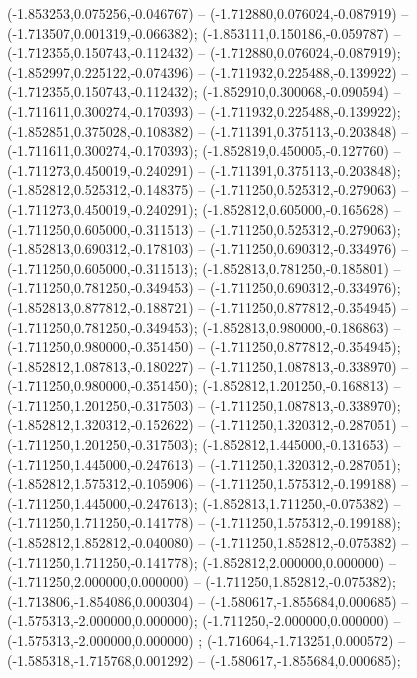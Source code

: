  (-1.853253,0.075256,-0.046767) -- (-1.712880,0.076024,-0.087919) -- (-1.713507,0.001319,-0.066382);
 (-1.853111,0.150186,-0.059787) -- (-1.712355,0.150743,-0.112432) -- (-1.712880,0.076024,-0.087919);
 (-1.852997,0.225122,-0.074396) -- (-1.711932,0.225488,-0.139922) -- (-1.712355,0.150743,-0.112432);
 (-1.852910,0.300068,-0.090594) -- (-1.711611,0.300274,-0.170393) -- (-1.711932,0.225488,-0.139922);
 (-1.852851,0.375028,-0.108382) -- (-1.711391,0.375113,-0.203848) -- (-1.711611,0.300274,-0.170393);
 (-1.852819,0.450005,-0.127760) -- (-1.711273,0.450019,-0.240291) -- (-1.711391,0.375113,-0.203848);
 (-1.852812,0.525312,-0.148375) -- (-1.711250,0.525312,-0.279063) -- (-1.711273,0.450019,-0.240291);
 (-1.852812,0.605000,-0.165628) -- (-1.711250,0.605000,-0.311513) -- (-1.711250,0.525312,-0.279063);
 (-1.852813,0.690312,-0.178103) -- (-1.711250,0.690312,-0.334976) -- (-1.711250,0.605000,-0.311513);
 (-1.852813,0.781250,-0.185801) -- (-1.711250,0.781250,-0.349453) -- (-1.711250,0.690312,-0.334976);
 (-1.852813,0.877812,-0.188721) -- (-1.711250,0.877812,-0.354945) -- (-1.711250,0.781250,-0.349453);
 (-1.852813,0.980000,-0.186863) -- (-1.711250,0.980000,-0.351450) -- (-1.711250,0.877812,-0.354945);
 (-1.852812,1.087813,-0.180227) -- (-1.711250,1.087813,-0.338970) -- (-1.711250,0.980000,-0.351450);
 (-1.852812,1.201250,-0.168813) -- (-1.711250,1.201250,-0.317503) -- (-1.711250,1.087813,-0.338970);
 (-1.852812,1.320312,-0.152622) -- (-1.711250,1.320312,-0.287051) -- (-1.711250,1.201250,-0.317503);
 (-1.852812,1.445000,-0.131653) -- (-1.711250,1.445000,-0.247613) -- (-1.711250,1.320312,-0.287051);
 (-1.852812,1.575312,-0.105906) -- (-1.711250,1.575312,-0.199188) -- (-1.711250,1.445000,-0.247613);
 (-1.852813,1.711250,-0.075382) -- (-1.711250,1.711250,-0.141778) -- (-1.711250,1.575312,-0.199188);
 (-1.852812,1.852812,-0.040080) -- (-1.711250,1.852812,-0.075382) -- (-1.711250,1.711250,-0.141778);
 (-1.852812,2.000000,0.000000) -- (-1.711250,2.000000,0.000000) -- (-1.711250,1.852812,-0.075382);
 (-1.713806,-1.854086,0.000304) -- (-1.580617,-1.855684,0.000685) -- (-1.575313,-2.000000,0.000000);
 (-1.711250,-2.000000,0.000000) -- (-1.575313,-2.000000,0.000000) ;
 (-1.716064,-1.713251,0.000572) -- (-1.585318,-1.715768,0.001292) -- (-1.580617,-1.855684,0.000685);
